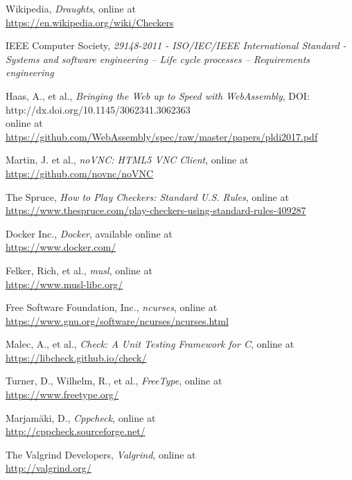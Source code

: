 \documentclass[letterpaper]{article}
\begin{document}
\newpage


\renewcommand{\bibsection}{\section{\refname}} %

\begin{thebibliography}{9}

    Wikipedia, \emph{Draughts},
    online at\\
    \url{https://en.wikipedia.org/wiki/Checkers}

    IEEE Computer Society, \emph{29148-2011 - ISO/IEC/IEEE
    International Standard - Systems and software engineering --
    Life cycle processes -- Requirements engineering}
    
    Haas, A., et al.,
    \emph{Bringing the Web up to Speed with WebAssembly},
    DOI: http://dx.doi.org/10.1145/3062341.3062363\\
    online at\\
    \url{https://github.com/WebAssembly/spec/raw/master/papers/pldi2017.pdf}

    Martin, J. et al., \emph{noVNC: HTML5 VNC Client},
    online at\\
    \url{https://github.com/novnc/noVNC}

    The Spruce, \emph{How to Play Checkers: Standard U.S. Rules},
    online at\\
    \url{https://www.thespruce.com/play-checkers-using-standard-rules-409287}

    Docker Inc., \emph{Docker}, available online at\\
    \url{https://www.docker.com/}

    Felker, Rich, et al., \emph{musl},
    online at\\
    \url{https://www.musl-libc.org/}

    Free Software Foundation, Inc., \emph{ncurses},
    online at\\
    \url{https://www.gnu.org/software/ncurses/ncurses.html}

    Malec, A., et al., \emph{Check: A Unit Testing Framework for C},
    online at\\
    \url{https://libcheck.github.io/check/}

    Turner, D., Wilhelm, R., et al., \emph{FreeType},
    online at\\
    \url{https://www.freetype.org/}

    Marjamäki, D., \emph{Cppcheck},
    online at\\
    \url{http://cppcheck.sourceforge.net/}

    The Valgrind Developers, \emph{Valgrind},
    online at\\
    \url{http://valgrind.org/}

\end{thebibliography}

\end{document}
